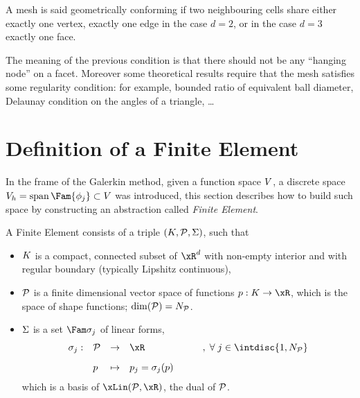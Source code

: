 \begin{dfntn}
A mesh is said geometrically conforming if two neighbouring cells share either exactly one vertex, exactly one edge in the case $d = 2$, or in the case $d = 3$ exactly one face.
\end{dfntn}

\medskip
The meaning of the previous condition is that there should not be any ``hanging node'' on a facet.
Moreover some theoretical results require that the mesh satisfies some regularity condition: for example, bounded ratio of equivalent ball diameter, Delaunay condition on the angles of a triangle, \dots

\section{Definition of a Finite Element}

In the frame of the Galerkin method, given a function space ${V}$, a discrete space $\xVh = \Span\Fam{\phi_j} \subset\xV$ was introduced, this section describes how to build such space by constructing an abstraction called \textit{Finite Element}.

\begin{dfntn}
A Finite Element consists of a triple ${({K},{\mathcal P}, {\Sigma})}$, such that
\begin{itemize}
\item ${K}$ is a compact, connected subset of $\xR^d$ with non-empty interior and with regular boundary (typically Lipshitz continuous),
\item ${\mathcal P}$ is a finite dimensional vector space of functions $p : K \rightarrow \xR$, which is the space of shape functions; $\dim({\mathcal P}) = N_{\mathcal P}$.
\item ${\Sigma}$ is a set $\Fam \sigma_j$ of linear forms,
\begin{equation*}
\begin{array}{lllll}
\sigma_j:& \SpaceP & \rightarrow & \xR &\qquad  ,\; \forany j \in \intdisc{1,N_\SpaceP}\\[2ex]
\hfill   & p       & \mapsto     & p_j = \sigma_j(p) &
\end{array}
\end{equation*}
which is a basis of $\xLin(\SpaceP,\xR)$, the dual of ${\mathcal P}$.
\end{itemize}
\end{dfntn}

